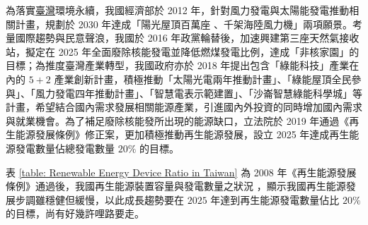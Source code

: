 

為落實\uline{臺灣}環境永續，我國經濟部於 2012 年，針對風力發電與太陽能發電推動相關計畫，規劃於 2030 年達成「陽光屋頂百萬座 、千架海陸風力機」兩項願景。考量國際趨勢與民意聲浪，我國於 2016 年政黨輪替後，加速興建第三座天然氣接收站，擬定在 2025 年全面廢除核能發電並降低燃煤發電比例，達成「非核家園」的目標；為推度臺灣產業轉型，我國政府亦於 2018 年提出包含「綠能科技」產業在內的 $5+2$ 產業創新計畫，積極推動「太陽光電兩年推動計畫」、「綠能屋頂全民參與」、「風力發電四年推動計畫」、「智慧電表示範建置」、「沙崙智慧綠能科學城」等計畫，希望結合國內需求發展相關能源產業，引進國內外投資的同時增加國內需求與就業機會。為了補足廢除核能發所出現的能源缺口，立法院於 2019 年通過《再生能源發展條例》修正案，更加積極推動再生能源發展，設立 2025 年達成再生能源發電數量佔總發電數量 $20\%$ 的目標。

表 \ref{table: Renewable Energy Device Ratio in Taiwan} 為 2008 年《再生能源發展條例》通過後，我國再生能源裝置容量與發電數量之狀況 \cite{boe2021data}，顯示我國再生能源發展步調雖穩健但緩慢，以此成長趨勢要在 $2025$ 年達到再生能源發電數量佔比 $20\%$ 的目標，尚有好幾許哩路要走。

